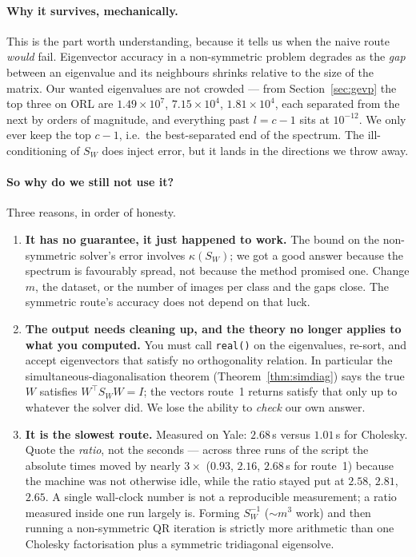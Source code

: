 \documentclass[11pt]{article}
\theoremstyle{definition}
\theoremstyle{remark}
\newcommand{\Sw}{S_W}
\begin{document}
\paragraph{Why it survives, mechanically.} This is the part worth understanding,
because it tells us when the naive route \emph{would} fail. Eigenvector accuracy
in a non-symmetric problem degrades as the \emph{gap} between an eigenvalue and
its neighbours shrinks relative to the size of the matrix. Our wanted
eigenvalues are not crowded --- from Section~\ref{sec:gevp} the top three on
ORL are $1.49\times10^{7}$, $7.15\times10^{4}$, $1.81\times10^{4}$, each
separated from the next by orders of magnitude, and everything past
$l=c-1$ sits at $10^{-12}$. We only ever keep the top $c-1$, i.e.\ the
best-separated end of the spectrum. The ill-conditioning of $\Sw$ does inject
error, but it lands in the directions we throw away.

\paragraph{So why do we still not use it?} Three reasons, in order of honesty.

\begin{enumerate}[nosep]
\item \textbf{It has no guarantee, it just happened to work.} The bound on the
  non-symmetric solver's error involves $\kappa(\Sw)$; we got a good answer
  because the spectrum is favourably spread, not because the method promised
  one. Change $m$, the dataset, or the number of images per class and the gaps
  close. The symmetric route's accuracy does not depend on that luck.
\item \textbf{The output needs cleaning up, and the theory no longer applies to
  what you computed.} You must call \texttt{real()} on the eigenvalues, re-sort,
  and accept eigenvectors that satisfy no orthogonality relation. In particular
  the simultaneous-diagonalisation theorem (Theorem~\ref{thm:simdiag}) says the
  true $W$ satisfies $W^{\!\top}\Sw W = I$; the vectors route~1 returns satisfy
  that only up to whatever the solver did. We lose the ability to \emph{check}
  our own answer.
\item \textbf{It is the slowest route.} Measured on Yale: $2.68$\,s versus
  $1.01$\,s for Cholesky. Quote the \emph{ratio}, not the seconds --- across
  three runs of the script the absolute times moved by nearly $3\times$
  ($0.93$, $2.16$, $2.68$\,s for route~1) because the machine was not otherwise
  idle, while the ratio stayed put at $2.58$, $2.81$, $2.65$. A single
  wall-clock number is not a reproducible measurement; a ratio measured inside
  one run largely is. Forming $\Sw^{-1}$
  ($\sim m^3$ work) and then running a non-symmetric QR iteration is strictly
  more arithmetic than one Cholesky factorisation plus a symmetric
  tridiagonal eigensolve.
\end{enumerate}
\end{document}

